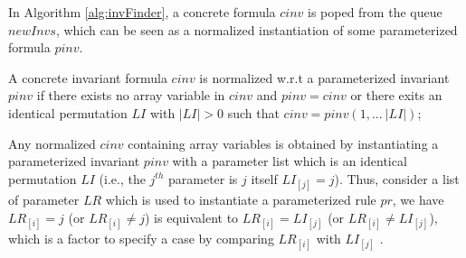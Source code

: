 \documentclass[final]{IEEEtran}
\newcommand\lyj[1]{\textcolor{magenta}{lyj: #1}}
\begin{document}
In Algorithm \ref{alg:invFinder}, a concrete formula $cinv$ is poped from the queue $newInvs$, which can be seen as a normalized instantiation of some parameterized formula $pinv$. %


\begin{definition}
A  concrete invariant formula $cinv$ is normalized w.r.t a parameterized invariant $pinv$ if  there exists no array variable in $cinv$ and $pinv=cinv$ or there exits an identical permutation $LI$ with $|LI|>0$ such that $cinv=pinv(1,...~|LI|)$;

\end{definition}

Any normalized $cinv$ containing array variables is obtained by instantiating a parameterized invariant $pinv$ with a parameter list which is an identical permutation $LI$ (i.e., the $j^{th}$ parameter is $j$ itself $LI_{[j]}=j$). Thus, consider a list of parameter $LR$ which is used to instantiate a parameterized rule $pr$, we  have $LR_{[i]}=j$ (or $LR_{[i]}\ne j$) is equivalent to $LR_{[i]}=LI_{[j]}$ (or $LR_{[i]}\ne LI_{[j]}$), %
which is a factor to specify a case by comparing $LR_{[i]}$ with $LI_{[j]}$ .  %
\end{document}
